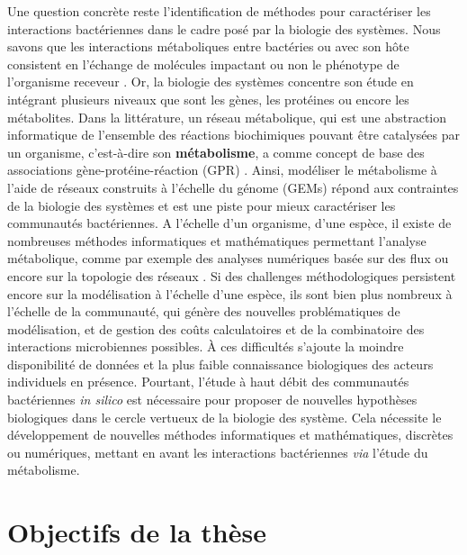 Une question concrète reste l’identification de méthodes pour caractériser les interactions bactériennes dans le cadre posé par la biologie des systèmes. Nous savons que les interactions métaboliques entre bactéries ou avec son hôte consistent en l'échange de molécules impactant ou non le phénotype de l’organisme receveur \citep{Faust2012}. Or, la biologie des systèmes concentre son étude en intégrant plusieurs niveaux que sont les gènes, les protéines ou encore les métabolites. Dans la littérature, un réseau métabolique, qui est une abstraction informatique de l'ensemble des réactions biochimiques pouvant être catalysées par un organisme, c’est-à-dire son \textbf{métabolisme}, a comme concept de base des associations gène-protéine-réaction (GPR) \citep{Thiele.2010}. Ainsi, modéliser le métabolisme à l'aide de réseaux construits à l'échelle du génome (GEMs) répond aux contraintes de la biologie des systèmes et est une piste pour mieux caractériser les communautés bactériennes. A l'échelle d'un organisme, d’une espèce, il existe de nombreuses méthodes informatiques et mathématiques permettant l'analyse métabolique, comme par exemple des analyses numériques basée sur des flux \citep{Orth2010} ou encore sur la topologie des réseaux \citep{kuffner2000}. Si des challenges méthodologiques persistent encore sur la modélisation à l’échelle d’une espèce, ils sont bien plus nombreux à l'échelle de la communauté, qui génère des nouvelles problématiques de modélisation, et de gestion des coûts calculatoires et de la combinatoire des interactions microbiennes possibles.  À ces difficultés s’ajoute la moindre disponibilité de données et la plus faible connaissance biologiques des acteurs individuels en présence. Pourtant, l'étude à haut débit des communautés bactériennes \textit{in silico} est nécessaire pour proposer de nouvelles hypothèses biologiques dans le cercle vertueux de la biologie des système. Cela nécessite le développement de nouvelles méthodes informatiques et mathématiques, discrètes ou numériques, mettant en avant les interactions bactériennes \textit{via} l'étude du métabolisme. 


%
\section{Objectifs de la thèse}

